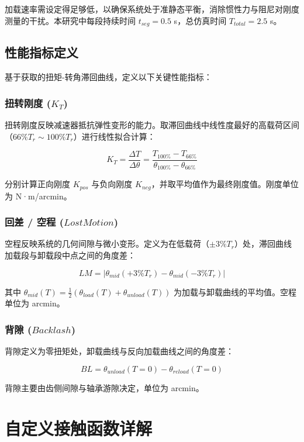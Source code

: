 \documentclass[12pt]{ctexart}
\begin{document}
加载速率需设定得足够低，以确保系统处于准静态平衡，消除惯性力与阻尼对刚度测量的干扰。本研究中每段持续时间 $t_{seg} = 0.5$ s，总仿真时间 $T_{total} = 2.5$ s。

\subsection{性能指标定义}
基于获取的扭矩-转角滞回曲线，定义以下关键性能指标：

\subsubsection{扭转刚度 ($K_T$)}
扭转刚度反映减速器抵抗弹性变形的能力。取滞回曲线中线性度最好的高载荷区间（$66\% T_r \sim 100\% T_r$）进行线性拟合计算：

\begin{equation}
K_T = \frac{\Delta T}{\Delta \theta} = \frac{T_{100\%} - T_{66\%}}{\theta_{100\%} - \theta_{66\%}}
\end{equation}

分别计算正向刚度 $K_{pos}$ 与负向刚度 $K_{neg}$，并取平均值作为最终刚度值。刚度单位为 N·m/arcmin。

\subsubsection{回差 / 空程 ($Lost Motion$)}
空程反映系统的几何间隙与微小变形。定义为在低载荷（$\pm 3\% T_r$）处，滞回曲线加载段与卸载段中点之间的角度差：

\begin{equation}
LM = |\theta_{mid}(+3\% T_r) - \theta_{mid}(-3\% T_r)|
\end{equation}

其中 $\theta_{mid}(T) = \frac{1}{2}(\theta_{load}(T) + \theta_{unload}(T))$ 为加载与卸载曲线的平均值。空程单位为 arcmin。

\subsubsection{背隙 ($Backlash$)}
背隙定义为零扭矩处，卸载曲线与反向加载曲线之间的角度差：

\begin{equation}
BL = \theta_{unload}(T=0) - \theta_{reload}(T=0)
\end{equation}

背隙主要由齿侧间隙与轴承游隙决定，单位为 arcmin。

\section{自定义接触函数详解}
\end{document}
